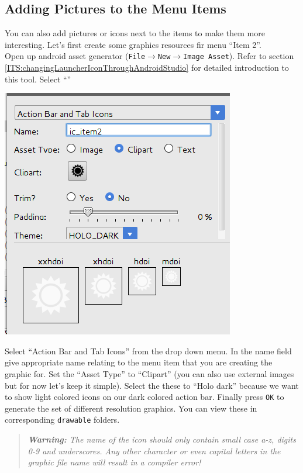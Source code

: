 \subsection{Adding Pictures to the Menu Items}
You can also add pictures or icons next to the items to make them more interesting. Let's first create some graphics resources fir menu ``Item 2''. \\

Open up android asset generator (\texttt{File}$\rightarrow$\texttt{New}$\rightarrow$\texttt{Image Asset}). Refer to section \ref{ITS:changingLauncherIconThroughAndroidStudio} for detailed introduction to this tool. Select ``''

\begin{center}
	\includegraphics[scale=0.4]{chapters/ch07/images/55}
\end{center}

Select ``Action Bar and Tab Icons'' from the drop down menu. In the name field give appropriate name relating to the menu item that you are creating the graphic for. Set the ``Asset Type'' to ``Clipart'' (you can also use external images but for now let's keep it simple). Select the these to ``Holo dark'' because we want to show light colored icons on our dark colored action bar. Finally press \texttt{OK} to generate the set of different resolution graphics. You can view these in corresponding \texttt{drawable} folders.

\begin{quote}
	\textit{\textbf{Warning:} The name of the icon should only contain small case a-z, digits 0-9 and underscores. Any other character or even capital letters in the graphic file name will result in a compiler error!}
\end{quote}


